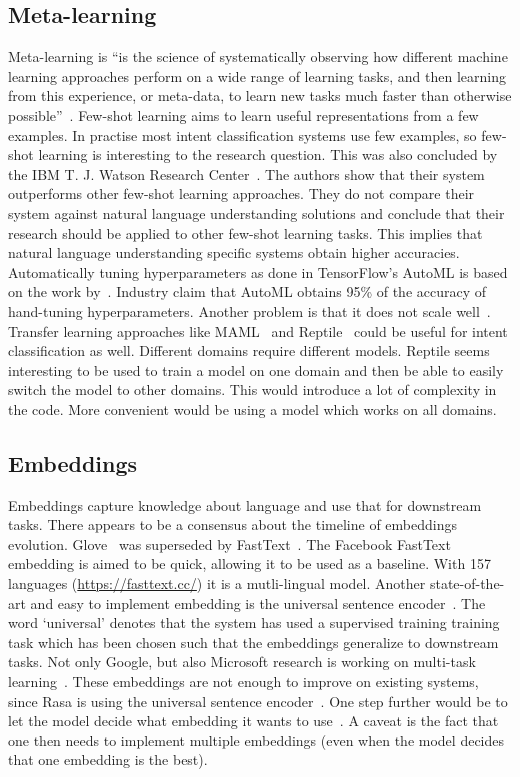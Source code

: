 \subsection{Meta-learning}
\label{subsec:meta-learning}
Meta-learning is ``is the science of systematically observing how different machine learning approaches perform on a wide range of learning tasks, and then learning from this experience, or meta-data, to learn new tasks much faster than otherwise possible''~\citet{vanschoren2018meta}.
Few-shot learning aims to learn useful representations from a few examples.
In practise most intent classification systems use few examples, so few-shot learning is interesting to the research question.
This was also concluded by the IBM T. J. Watson Research Center~\citep{yu2018diverse}.
The authors show that their system outperforms other few-shot learning approaches.
They do not compare their system against natural language understanding solutions and conclude that their research should be applied to other few-shot learning tasks.
This implies that natural language understanding specific systems obtain higher accuracies.
Automatically tuning hyperparameters as done in TensorFlow's AutoML is based on the work by~\citet{andrychowicz2016learning}.
Industry claim that AutoML obtains 95\% of the accuracy of hand-tuning hyperparameters.
Another problem is that it does not scale well~\citep{jones2017}.
Transfer learning approaches like MAML~\citep{finn2017model} and Reptile~\citep{nichol2018reptile} could be useful for intent classification as well.
Different domains require different models.
Reptile seems interesting to be used to train a model on one domain and then be able to easily switch the model to other domains.
This would introduce a lot of complexity in the code.
More convenient would be using a model which works on all domains.

\subsection{Embeddings}
\label{subsec:embeddings}
Embeddings capture knowledge about language and use that for downstream tasks.
There appears to be a consensus about the timeline of embeddings evolution.
Glove~\citep{pennington2014} was superseded by FastText~\citep{joulin2016bag}.
The Facebook FastText embedding is aimed to be quick, allowing it to be used as a baseline.
With 157 languages (\url{https://fasttext.cc/}) it is a mutli-lingual model.
Another state-of-the-art and easy to implement embedding is the universal sentence encoder~\citep{cer2018universal}.
The word `universal' denotes that the system has used a supervised training training task which has been chosen such that the embeddings generalize to downstream tasks.
Not only Google, but also Microsoft research is working on multi-task learning~\citep{subramanian2018learning}.
These embeddings are not enough to improve on existing systems, since Rasa is using the universal sentence encoder~\citep{wiese2018}.
One step further would be to let the model decide what embedding it wants to use~\citep{kiela2018dynamic}.
A caveat is the fact that one then needs to implement multiple embeddings (even when the model decides that one embedding is the best).
